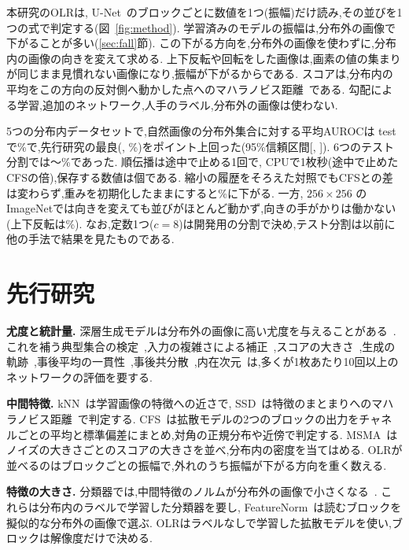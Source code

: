 \documentclass[MIRU,submit]{miru2025j}
\newcommand{\Ours}{OLR}   %
\begin{document}
本研究の\Ours{}は, U-Net~\cite{ronneberger2015unet}のブロックごとに数値を1つ(振幅)だけ読み,その並びを1つの式で判定する(図~\ref{fig:method}). 学習済みのモデルの振幅は,分布外の画像で下がることが多い(\ref{sec:fall}節). この下がる方向を,分布外の画像を使わずに,分布内の画像の向きを変えて求める. 上下反転や回転をした画像は,画素の値の集まりが同じまま見慣れない画像になり,振幅が下がるからである. スコアは,分布内の平均をこの方向の反対側へ動かした点へのマハラノビス距離~\cite{lee2018mahalanobis}である. 勾配による学習,追加のネットワーク,人手のラベル,分布外の画像は使わない.

5つの分布内データセットで,自然画像の分布外集合に対する平均AUROCは test で\olTestOL\%で,先行研究の最良(\olBestPriorName, \olBestPriorMean\%)を\olGapCfsKnn{}ポイント上回った(95\%信頼区間[\olGapCfsKnnLo, \olGapCfsKnnHi]). 6つのテスト分割では\olSixMin{}〜\olSixMax\%であった. 順伝播は途中で止める1回で, CPUで1枚\olSecOL{}秒(途中で止めたCFSの\olSecRatioCfsKnn{}倍),保存する数値は\olNStored{}個である. 縮小の履歴をそろえた対照でもCFSとの差は変わらず,重みを初期化したままにすると\olVarRinit\%に下がる. 一方, $256{\times}256$ のImageNetでは向きを変えても並びがほとんど動かず,向きの手がかりは働かない(上下反転は\olHrOLVf\%). なお,定数1つ($c=8$)は開発用の分割で決め,テスト分割は以前に他の手法で結果を見たものである.

\section{先行研究}
\label{sec:related}
\textbf{尤度と統計量.} 深層生成モデルは分布外の画像に高い尤度を与えることがある~\cite{nalisnick2019deep,serra2020input}. これを補う典型集合の検定~\cite{nalisnick2019typ},入力の複雑さによる補正~\cite{serra2020input},スコアの大きさ~\cite{mahmood2021msma},生成の軌跡~\cite{heng2024diffpath},事後平均の一貫性~\cite{alexis2026gepc},事後共分散~\cite{shoushtari2026eigenscore},内在次元~\cite{kamkari2024geometric}は,多くが1枚あたり10回以上のネットワークの評価を要する.

\textbf{中間特徴.} kNN~\cite{sun2022knn}は学習画像の特徴への近さで, SSD~\cite{sehwag2021ssd}は特徴のまとまりへのマハラノビス距離~\cite{lee2018mahalanobis}で判定する. CFS~\cite{rouzoumka2026cfs}は拡散モデルの2つのブロックの出力をチャネルごとの平均と標準偏差にまとめ,対角の正規分布や近傍で判定する. MSMA~\cite{mahmood2021msma}はノイズの大きさごとのスコアの大きさを並べ,分布内の密度を当てはめる. \Ours{}が並べるのはブロックごとの振幅で,外れのうち振幅が下がる方向を重く数える.

\textbf{特徴の大きさ.} 分類器では,中間特徴のノルムが分布外の画像で小さくなる~\cite{yu2023featurenorm,park2023featurenorm}. これらは分布内のラベルで学習した分類器を要し, FeatureNorm~\cite{yu2023featurenorm}は読むブロックを擬似的な分布外の画像で選ぶ. \Ours{}はラベルなしで学習した拡散モデルを使い,ブロックは解像度だけで決める.
\end{document}
